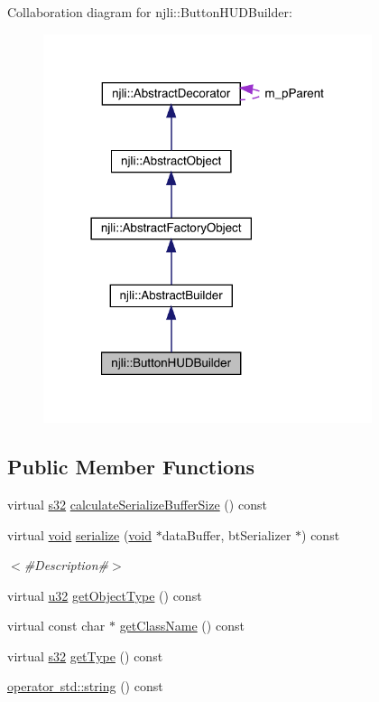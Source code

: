 Collaboration diagram for njli\+:\+:Button\+H\+U\+D\+Builder\+:\nopagebreak
\begin{figure}[H]
\begin{center}
\leavevmode
\includegraphics[width=273pt]{classnjli_1_1_button_h_u_d_builder__coll__graph}
\end{center}
\end{figure}
\subsection*{Public Member Functions}
\begin{DoxyCompactItemize}
\item 
virtual \mbox{\hyperlink{_util_8h_aa62c75d314a0d1f37f79c4b73b2292e2}{s32}} \mbox{\hyperlink{classnjli_1_1_button_h_u_d_builder_a7ee11dd8bb9747e13471abb9e8cbfb25}{calculate\+Serialize\+Buffer\+Size}} () const
\item 
virtual \mbox{\hyperlink{_thread_8h_af1e856da2e658414cb2456cb6f7ebc66}{void}} \mbox{\hyperlink{classnjli_1_1_button_h_u_d_builder_a8fabff458b635395dfcaed73aec4f438}{serialize}} (\mbox{\hyperlink{_thread_8h_af1e856da2e658414cb2456cb6f7ebc66}{void}} $\ast$data\+Buffer, bt\+Serializer $\ast$) const
\begin{DoxyCompactList}\small\item\em $<$\#\+Description\#$>$ \end{DoxyCompactList}\item 
virtual \mbox{\hyperlink{_util_8h_a10e94b422ef0c20dcdec20d31a1f5049}{u32}} \mbox{\hyperlink{classnjli_1_1_button_h_u_d_builder_aab151f1c413960cb7947976d405d6397}{get\+Object\+Type}} () const
\item 
virtual const char $\ast$ \mbox{\hyperlink{classnjli_1_1_button_h_u_d_builder_a8557df23bbea4d66c2281d81e120fd8e}{get\+Class\+Name}} () const
\item 
virtual \mbox{\hyperlink{_util_8h_aa62c75d314a0d1f37f79c4b73b2292e2}{s32}} \mbox{\hyperlink{classnjli_1_1_button_h_u_d_builder_af3e9aa36492c2e5f260ae274c3e5e902}{get\+Type}} () const
\item 
\mbox{\hyperlink{classnjli_1_1_button_h_u_d_builder_a598c95a41ace9cd75df2381bba2c5cb5}{operator std\+::string}} () const
\end{DoxyCompactItemize}
